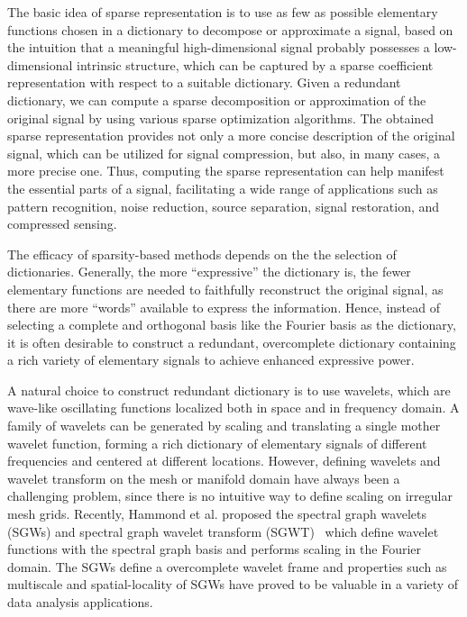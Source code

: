 The basic idea of sparse representation is to use as few as possible elementary functions chosen in a dictionary
to decompose or approximate a signal, based on the intuition that a meaningful high-dimensional signal probably
possesses a low-dimensional intrinsic structure, which can be captured by a sparse coefficient representation with
respect to a suitable dictionary. Given a redundant dictionary, we can compute a sparse decomposition or approximation
of the original signal by using various sparse optimization algorithms. The obtained sparse representation provides not
only a more concise description of the original signal, which can be utilized for signal compression, but also, in many cases,
a more precise one. Thus, computing the sparse representation can help manifest the essential parts of a signal,
facilitating a wide range of applications such as pattern recognition, noise reduction, source separation, signal restoration,
and compressed sensing.

The efficacy of sparsity-based methods depends on the the selection of dictionaries. Generally, the more ``expressive''
the dictionary is, the fewer elementary functions are needed to faithfully reconstruct the original signal, as there
are more ``words'' available to express the information. Hence, instead of selecting a complete and orthogonal basis
like the Fourier basis as the dictionary, it is often desirable to construct a redundant, overcomplete dictionary containing
a rich variety of elementary signals to achieve enhanced expressive power.

A natural choice to construct redundant dictionary is to use wavelets, which are wave-like oscillating functions
localized both in space and in frequency domain. A family of wavelets can be generated by scaling and translating a
single mother wavelet function, forming a rich dictionary of elementary signals of different frequencies and centered
at different locations. However, defining wavelets and wavelet transform on the mesh or manifold domain have always been
a challenging problem, since there is no intuitive way to define scaling on irregular mesh grids. Recently, Hammond et al.
proposed the spectral graph wavelets (SGWs) and spectral graph wavelet transform (SGWT)~\cite{Hammond2011}
which define wavelet functions with the spectral graph basis and performs scaling in the Fourier domain. The SGWs define
a overcomplete wavelet frame and properties such as multiscale and spatial-locality of SGWs have proved to be valuable in
a variety of data analysis applications.

